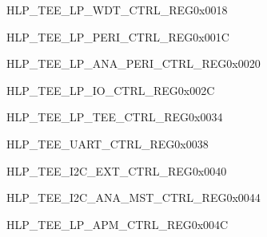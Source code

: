 \begin{register}{H}{LP\_TEE\_LP\_WDT\_CTRL\_REG}{0x0018}\label{regdesc:LPTEELPWDTCTRLREG}
\end{register}\vspace{-3em} 

\begin{register}{H}{LP\_TEE\_LP\_PERI\_CTRL\_REG}{0x001C}\label{regdesc:LPTEELPPERICTRLREG}
\end{register}\vspace{-3em} 

\begin{register}{H}{LP\_TEE\_LP\_ANA\_PERI\_CTRL\_REG}{0x0020}\label{regdesc:LPTEELPANAPERICTRLREG}
\end{register}\vspace{-3em} 

\begin{register}{H}{LP\_TEE\_LP\_IO\_CTRL\_REG}{0x002C}\label{regdesc:LPTEELPIOCTRLREG}
\end{register}\vspace{-3em} 

\begin{register}{H}{LP\_TEE\_LP\_TEE\_CTRL\_REG}{0x0034}\label{regdesc:LPTEELPTEECTRLREG}
\end{register}\vspace{-3em} 

\begin{register}{H}{LP\_TEE\_UART\_CTRL\_REG}{0x0038}\label{regdesc:LPTEEUARTCTRLREG}
\end{register}\vspace{-3em} 

\begin{register}{H}{LP\_TEE\_I2C\_EXT\_CTRL\_REG}{0x0040}\label{regdesc:LPTEEI2CEXTCTRLREG}
\end{register}\vspace{-3em} 

\begin{register}{H}{LP\_TEE\_I2C\_ANA\_MST\_CTRL\_REG}{0x0044}\label{regdesc:LPTEEI2CANAMSTCTRLREG}
\end{register}\vspace{-3em} 


\begin{register}{H}{LP\_TEE\_LP\_APM\_CTRL\_REG}{0x004C}\label{regdesc:LPTEELPAPMCTRLREG}
\end{register}\vspace{-3em} 

